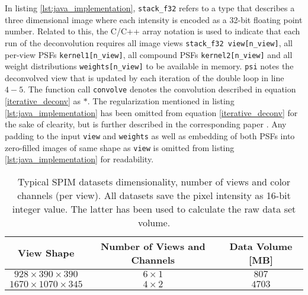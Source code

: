 In listing \ref{lst:java_implementation}, \texttt{stack\_f32} refers to a type that describes a three dimensional image where each intensity is encoded as a 32-bit floating point number. Related to this, the C/C++ array notation is used to indicate that each run of the deconvolution requires all image views \texttt{stack\_f32 view[n\_view]}, all per-view PSFs \texttt{kernel1[n\_view]}, all compound PSFs \texttt{kernel2[n\_view]} and all weight distributions \texttt{weights[n\_view]} to be available in memory. \texttt{psi} notes the deconvolved view that is updated by each iteration of the double loop in line $4-5$. The function call \texttt{convolve} denotes the convolution described in equation \ref{iterative_deconv} as $\ast$. The regularization mentioned in listing \ref{lst:java_implementation} has been omitted from equation \ref{iterative_deconv} for the sake of clearity, but is further described in the corresponding paper \cite{2013arXiv1308.0730P}. Any padding to the input \texttt{view} and \texttt{weights} as well as embedding of both PSFs into zero-filled images of same shape as \texttt{view} is omitted from listing \ref{lst:java_implementation} for readability. \newline

\begin{table}
  \begin{tabular}{ccc}                                                                                                                                                                              
    \hline                                                                                                                                                                                         
    View Shape  & Number of Views and Channels & Data Volume [MB]   \\
    \hline                                                       
    $928\times390\times390$ & $6 \times 1$ & $807$ \\
    $1670\times1070\times345$ & $4 \times 2$ & $4703$ \\
    \hline                                                                                                                                                                                         
  \end{tabular} 
  \label{typ_datasets}
  \caption{Typical SPIM datasets dimensionality, number of views and color channels (per view). All datasets save the pixel intensity as 16-bit integer value. The latter has been used to calculate the raw data set volume.}
\end{table} 


